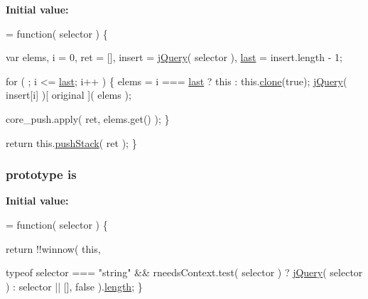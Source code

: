 {\bfseries Initial value\-:}
\begin{DoxyCode}
= \textcolor{keyword}{function}( selector ) \{


        var elems,
            i = 0,
            ret = [],
            insert = \hyperlink{jquery-1_810_82-vsdoc_8js_add5237586d970a38a81f990e8eb28c6c}{jQuery}( selector ),
            \hyperlink{jquery-1_810_82-vsdoc_8js_a5a9684d230de11a6ec3029bcce128977}{last} = insert.length - 1;

        \textcolor{keywordflow}{for} ( ; i <= \hyperlink{jquery-1_810_82-vsdoc_8js_a5a9684d230de11a6ec3029bcce128977}{last}; i++ ) \{
            elems = i === \hyperlink{jquery-1_810_82-vsdoc_8js_a5a9684d230de11a6ec3029bcce128977}{last} ? \textcolor{keyword}{this} : this.\hyperlink{jquery-1_810_82-vsdoc_8js_a7d74ce76585989b4b6e2d506577e13ad}{clone}(\textcolor{keyword}{true});
            \hyperlink{jquery-1_810_82-vsdoc_8js_add5237586d970a38a81f990e8eb28c6c}{jQuery}( insert[i] )[ original ]( elems );

            
            core\_push.apply( ret, elems.get() );
        \}

        \textcolor{keywordflow}{return} this.\hyperlink{jquery-1_810_82-vsdoc_8js_afc3a7db1ef2b526338c06c07cecccd44}{pushStack}( ret );
    \}
\end{DoxyCode}
\hypertarget{jquery-1_810_82-vsdoc_8js_ab09af0fb8923d70813f6d128591d1962}{
\subsubsection[{is}]{ {\bf prototype} is}}\label{jquery-1_810_82-vsdoc_8js_ab09af0fb8923d70813f6d128591d1962}
{\bfseries Initial value\-:}
\begin{DoxyCode}
= \textcolor{keyword}{function}( selector ) \{


        \textcolor{keywordflow}{return} !!winnow(
            \textcolor{keyword}{this},

            
            
            typeof selector === \textcolor{stringliteral}{"string"} && rneedsContext.test( selector ) ?
                \hyperlink{jquery-1_810_82-vsdoc_8js_add5237586d970a38a81f990e8eb28c6c}{jQuery}( selector ) :
                selector || [],
            false
        ).\hyperlink{jquery-1_810_82-vsdoc_8js_aa7de35d58da66d9944ab9cbe82c19640}{length};
    \}
\end{DoxyCode}
